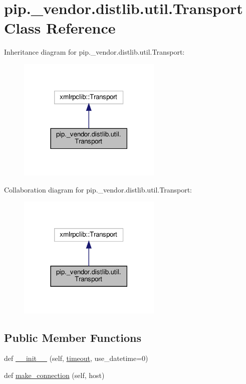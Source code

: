 \hypertarget{classpip_1_1__vendor_1_1distlib_1_1util_1_1Transport}{}\section{pip.\+\_\+vendor.\+distlib.\+util.\+Transport Class Reference}
\label{classpip_1_1__vendor_1_1distlib_1_1util_1_1Transport}


Inheritance diagram for pip.\+\_\+vendor.\+distlib.\+util.\+Transport\+:
\nopagebreak
\begin{figure}[H]
\begin{center}
\leavevmode
\includegraphics[width=194pt]{classpip_1_1__vendor_1_1distlib_1_1util_1_1Transport__inherit__graph}
\end{center}
\end{figure}


Collaboration diagram for pip.\+\_\+vendor.\+distlib.\+util.\+Transport\+:
\nopagebreak
\begin{figure}[H]
\begin{center}
\leavevmode
\includegraphics[width=194pt]{classpip_1_1__vendor_1_1distlib_1_1util_1_1Transport__coll__graph}
\end{center}
\end{figure}
\subsection*{Public Member Functions}
\begin{DoxyCompactItemize}
\item 
def \hyperlink{classpip_1_1__vendor_1_1distlib_1_1util_1_1Transport_ae362e89c16f30cf7449ed1c7de0d38ed}{\+\_\+\+\_\+init\+\_\+\+\_\+} (self, \hyperlink{classpip_1_1__vendor_1_1distlib_1_1util_1_1Transport_aa8e0d6a58347c3af195b85a75366d864}{timeout}, use\+\_\+datetime=0)
\item 
def \hyperlink{classpip_1_1__vendor_1_1distlib_1_1util_1_1Transport_ac988f75576e5cda26e586e3aadd1b148}{make\+\_\+connection} (self, host)
\end{DoxyCompactItemize}
